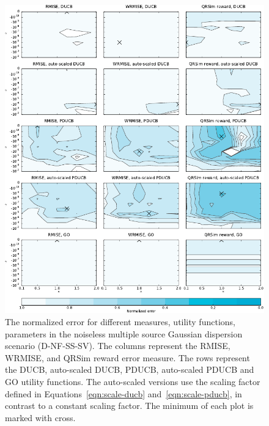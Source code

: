 \begin{figure}
    \centering
    \includegraphics{plots/psearch-D-NF-MS-SV}
    \caption[Normalized error (D-NF-MS-SV)]{The normalized error for different 
        measures, utility functions, parameters in the noiseless multiple source 
        Gaussian dispersion scenario (D-NF-SS-SV).  The columns represent the 
        RMISE, WRMISE, and QRSim reward error measure.  The rows represent the 
        DUCB, auto-scaled DUCB, PDUCB, auto-scaled PDUCB and GO utility 
        functions. The auto-scaled versions use the scaling factor defined in 
        Equations~\ref{eqn:scale-ducb} and~\ref{eqn:scale-pducb}, in contrast to 
        a constant scaling factor.  The minimum of each plot is marked with 
        cross.}\label{fig:psearch-D-NF-MS-SV}
\end{figure}

\newenvironment{errtbl}{\begin{tabular}{lllSSSS}\toprule}{\bottomrule\end{tabular}}
\newcommand*{\errtblhead}[1]{
        & & &
        \multicolumn{2}{c}{#1} &
        \multicolumn{2}{c}{Norm.\ #1} \\
        \cmidrule(lr){4-5} \cmidrule(lr){6-7}

        Utility function &
        \multicolumn{1}{l}{$\kappa$} &
        \multicolumn{1}{l}{$\gamma$} &
        \multicolumn{1}{c}{Mean} &
        \multicolumn{1}{c}{SD} &
        \multicolumn{1}{c}{Mean} &
        \multicolumn{1}{c}{SD} \\
        & & &
        \multicolumn{1}{c}{\si{\nano\gram\per\meter\cubed}} &
        \multicolumn{1}{c}{\si{\nano\gram\per\meter\cubed}} &
        & \\ \midrule }

